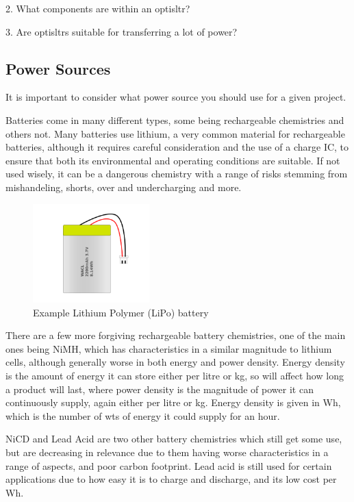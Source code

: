 \documentclass[a4paper,11pt]{report}
\begin{document}
2. What components are within an \gls{optisltr}?

3. Are \gls{optisltr}s suitable for transferring a lot of power?

\vspace*{1\baselineskip}

\subsection{Power Sources}

It is important to consider what power source you should use for a given project.

Batteries come in many different types, some being rechargeable chemistries and others not. Many batteries use lithium, a very common material for rechargeable batteries, although it requires careful consideration and the use of a charge IC, to ensure that both its environmental and operating conditions are suitable. If not used wisely, it can be a dangerous chemistry with a range of risks stemming from mishandeling, shorts, over and undercharging and more.

\begin{figure}[H]
\centering
\includegraphics[width=0.4\textwidth]{lipobattery}
\caption{Example Lithium Polymer (LiPo) battery}
\end{figure}

There are a few more forgiving rechargeable battery chemistries, one of the main ones being NiMH, which has characteristics in a similar magnitude to lithium cells, although generally worse in both energy and power density. Energy density is the amount of energy it can store either per litre or kg, so will affect how long a product will last, where power density is the magnitude of power it can continuously supply, again either per litre or kg. Energy density is given in Wh, which is the number of \gls{wt}s of energy it could supply for an hour.

NiCD and Lead Acid are two other battery chemistries which still get some use, but are decreasing in relevance due to them having worse characteristics in a range of aspects, and poor carbon footprint. Lead acid is still used for certain applications due to how easy it is to charge and discharge, and its low cost per Wh.
\end{document}

